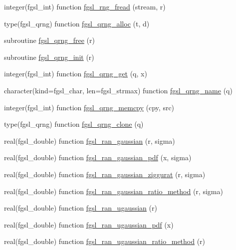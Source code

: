 \begin{DoxyCompactItemize}
\item 
integer(fgsl\+\_\+int) function \hyperlink{rng_8finc_a1e80994301a7b45f4203ce55d90a86fe}{fgsl\+\_\+rng\+\_\+fread} (stream, r)
\item 
type(fgsl\+\_\+qrng) function \hyperlink{rng_8finc_a5dd0e79d47ed21591ed2906315a5ed4b}{fgsl\+\_\+qrng\+\_\+alloc} (t, d)
\item 
subroutine \hyperlink{rng_8finc_ac61e779e7158279aa883358098f67a5a}{fgsl\+\_\+qrng\+\_\+free} (r)
\item 
subroutine \hyperlink{rng_8finc_adbebd9f4a0213e6eb61756e412046d67}{fgsl\+\_\+qrng\+\_\+init} (r)
\item 
integer(fgsl\+\_\+int) function \hyperlink{rng_8finc_a4c172d25dab4c49dba69428b61bc4adf}{fgsl\+\_\+qrng\+\_\+get} (q, x)
\item 
character(kind=fgsl\+\_\+char, len=fgsl\+\_\+strmax) function \hyperlink{rng_8finc_af55d78c79c3e7d3a3d8666fc7dfc6ddd}{fgsl\+\_\+qrng\+\_\+name} (q)
\item 
integer(fgsl\+\_\+int) function \hyperlink{rng_8finc_a7ce0da63d2654bb003f84a999bb7b6ce}{fgsl\+\_\+qrng\+\_\+memcpy} (cpy, src)
\item 
type(fgsl\+\_\+qrng) function \hyperlink{rng_8finc_af9487d956c6b72f72ccb50a5ed28e92d}{fgsl\+\_\+qrng\+\_\+clone} (q)
\item 
real(fgsl\+\_\+double) function \hyperlink{rng_8finc_a04f4cd4894dc3510006365f5211b8dda}{fgsl\+\_\+ran\+\_\+gaussian} (r, sigma)
\item 
real(fgsl\+\_\+double) function \hyperlink{rng_8finc_aefb1b7aca8d4240cdf6ad29706f53ba6}{fgsl\+\_\+ran\+\_\+gaussian\+\_\+pdf} (x, sigma)
\item 
real(fgsl\+\_\+double) function \hyperlink{rng_8finc_ab23c2a1b1d2f0b21697675ac00fca191}{fgsl\+\_\+ran\+\_\+gaussian\+\_\+ziggurat} (r, sigma)
\item 
real(fgsl\+\_\+double) function \hyperlink{rng_8finc_a3a942206e136585fd8ffb9761bbad505}{fgsl\+\_\+ran\+\_\+gaussian\+\_\+ratio\+\_\+method} (r, sigma)
\item 
real(fgsl\+\_\+double) function \hyperlink{rng_8finc_a679c4c83b2e8f8cedc96f5eca1b7929a}{fgsl\+\_\+ran\+\_\+ugaussian} (r)
\item 
real(fgsl\+\_\+double) function \hyperlink{rng_8finc_ab45ce99f5d0cc4b3b7981cb89584c0ca}{fgsl\+\_\+ran\+\_\+ugaussian\+\_\+pdf} (x)
\item 
real(fgsl\+\_\+double) function \hyperlink{rng_8finc_a720e375637bfce16e56c42f2e11b5802}{fgsl\+\_\+ran\+\_\+ugaussian\+\_\+ratio\+\_\+method} (r)

\end{DoxyCompactItemize}
